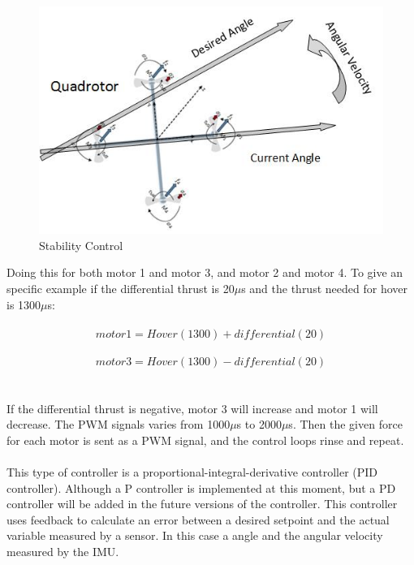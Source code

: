 \begin{figure}[H]
          \centering
            \includegraphics[scale = 0.67]{VAPIQ-PICTURES/OnBCS.jpg}
                \caption{Stability Control}
                \label{StabiilityControl}
            \label{dir}
\end{figure} 
\noindent
Doing this for both motor 1 and motor 3, and motor 2 and motor 4. To give an specific example if the differential thrust is 20$\mu$s and the thrust needed for hover is 1300$\mu$s: 
\\\\
$$motor1 = Hover (1300) + differential (20)$$ \\
$$motor3 = Hover (1300) - differential (20)$$ 
\\\\
If the differential thrust is negative, motor 3 will increase and motor 1 will decrease. The PWM signals varies from 1000$\mu$s to 2000$\mu$s. Then the given force for each motor is sent as a PWM signal, and the control loops rinse and repeat.
\\\\
This type of controller is a proportional-integral-derivative controller (PID controller). Although a P controller is implemented at this moment, but a PD controller will be added in the future versions of the controller. This controller uses feedback to calculate an error between a desired setpoint and the actual variable measured by a sensor. In this case a angle and the angular velocity measured by the IMU.


